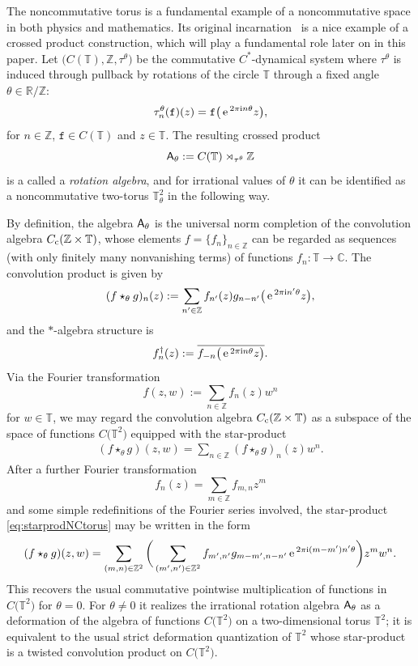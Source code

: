 \documentclass[10pt,a4paper]{amsart}
\numberwithin{equation}{section}
\newcommand{\Z}{\zed}
\def\ii{{{\rm i}}}
\def\A{{\sf A}}
\newcommand{\complex}{{\mathbb C}} %
\newcommand{\zed}{{\mathbb Z}} %
\newcommand{\real}{{\mathbb R}} %
\newcommand{\torus}{{\mathbb T}} %
\def\e{{\,\rm e}\,}
\begin{document}
\begin{Example}\label{ex:NCtori}
The noncommutative torus is a fundamental example
of a noncommutative space in both physics and mathematics. Its
original incarnation~\cite{Rieffel1981} is a nice example of a crossed
product construction, which will play a fundamental role later on in this
paper. Let $\big(C(\torus),\Z,\tau^\theta\big)$ be the commutative $C^*$-dynamical system
where $\tau^\theta$ is induced through pullback by rotations of the circle $\torus$ through
a fixed angle $\theta\in\real/\Z$:
\[
\tau^\theta_n(\mathtt{f})(z) = \mathtt{f}\big(\e^{2\pi\ii n \theta} z\big) ,
\]
for $n\in\Z$, $\mathtt{f}\in C(\torus)$ and $z\in\torus$. The resulting crossed
product
\[
\A_\theta:=C(\torus)\rtimes_{\tau^\theta}\Z
\]
is a called a \emph{rotation
algebra}, and for irrational values of $\theta$ it can be identified as a noncommutative two-torus
$\torus_\theta^2$ in the following way.

By definition, the algebra
$\A_\theta$ is the universal norm completion of the convolution
algebra $C_{\rm c}(\Z\times\torus)$, whose elements $f=\{f_n\}_{n\in\Z}$ can be regarded as
sequences (with only finitely many nonvanishing
terms) of functions $f_n\colon \torus\to\complex$. The convolution product is
given by
\[
(f\star_\theta g)_n(z) := \sum_{n'\in\Z} f_{n'}(z) g_{n-n'}\big(\e^{2\pi\ii n' \theta} z\big) ,
\]
and the $*$-algebra structure is
\[
f^\dag_n(z):=\overline{f_{-n}\big(\e^{2\pi\ii n \theta} z\big)} .
\]
Via the Fourier transformation
\[
f(z,w) := \sum_{n\in\Z} f_{n}(z) w^n
\]
for $w\in\torus$, we may regard the convolution algebra $C_{\rm
 c}(\Z\times\torus)$ as a subspace of the space of functions $C\big(\torus^2\big)$ equipped
with the star-product
\begin{gather}\label{eq:starprodNCtorus}
(f\star_\theta g)(z,w) = \sum_{n\in\Z} (f\star_\theta g)_n(z) w^n .
\end{gather}
After a further Fourier transformation
\[
f_n(z) = \sum_{m\in\Z} f_{m,n} z^m
\]
and some simple redefinitions of the Fourier series involved, the
star-product \eqref{eq:starprodNCtorus} may be written in the form
\[
(f\star_\theta g)(z,w) = \sum_{(m,n)\in\Z^2}
\bigg(\sum_{(m',n')\in\Z^2} f_{m',n'} g_{m-m',n-n'}
\e^{2\pi\ii (m-m') n' \theta}\bigg) z^m w^n .
\]
This recovers the usual commutative pointwise multiplication of functions in
$C\big(\torus^2\big)$ for $\theta=0$. For $\theta\neq0$ it realizes the irrational rotation algebra $\A_\theta$ as a
deformation of the algebra of functions $C\big(\torus^2\big)$ on a
two-dimensional torus $\torus^2$; it is equivalent to the usual strict
deformation quantization of $\torus^2$ whose star-product is a twisted
convolution product on $C\big(\torus^2\big)$.


\end{Example}
\end{document}
